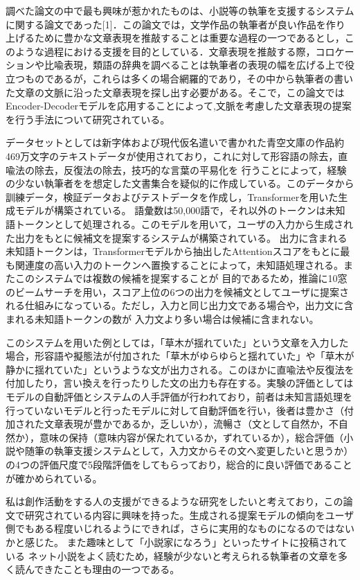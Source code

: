 \documentclass[twocolumn]{jsarticle}     %
\begin{document}
調べた論文の中で最も興味が惹かれたものは、小説等の執筆を支援するシステムに関する論文であった[1]．この論文では，文学作品の執筆者が良い作品を作り上げるために豊かな文章表現を推敲することは重要な過程の一つであるとし，このような過程における支援を目的としている．文章表現を推敲する際，コロケーションや比喩表現，類語の辞典を調べることは執筆者の表現の幅を広げる上で役立つものであるが，これらは多くの場合網羅的であり，その中から執筆者の書いた文章の文脈に沿った文章表現を探し出す必要がある。そこで，この論文では
Encoder-Decoderモデルを応用することによって,文脈を考慮した文章表現の提案を行う手法について研究されている。

データセットとしては新字体および現代仮名遣いで書かれた青空文庫の作品約469万文字のテキストデータが使用されており，これに対して形容語の除去，直喩法の除去，反復法の除去，技巧的な言葉の平易化を
行うことによって，経験の少ない執筆者をを想定した文書集合を疑似的に作成している。このデータから訓練データ，検証データおよびテストデータを作成し，Transformerを用いた生成モデルが構築されている。
語彙数は50,000語で，それ以外のトークンは未知語トークンとして処理される。このモデルを用いて，ユーザの入力から生成された出力をもとに候補文を提案するシステムが構築されている。
出力に含まれる未知語トークンは，Transformerモデルから抽出したAttentionスコアをもとに最も関連度の高い入力のトークンへ置換することによって，未知語処理される。またこのシステムでは複数の候補を提案することが
目的であるため，推論に10窓のビームサーチを用い，スコア上位の6つの出力を候補文としてユーザに提案される仕組みになっている。ただし，入力と同じ出力文である場合や，出力文に含まれる未知語トークンの数が
入力文より多い場合は候補に含まれない。

このシステムを用いた例としては，「草木が揺れていた」という文章を入力した場合，形容語や擬態法が付加された「草木がゆらゆらと揺れていた」や「草木が静かに揺れていた」というような文が出力される。このほかに直喩法や反復法を付加したり，言い換えを行ったりした文の出力も存在する。実験の評価としてはモデルの自動評価とシステムの人手評価が行われており，前者は未知言語処理を行っていないモデルと行ったモデルに対して自動評価を行い，後者は豊かさ（付加された文章表現が豊かであるか，乏しいか），流暢さ（文として自然か，不自然か），意味の保持（意味内容が保たれているか，ずれているか），総合評価（小説や随筆の執筆支援システムとして，入力文からその文へ変更したいと思うか）の4つの評価尺度で5段階評価をしてもらっており，総合的に良い評価であることが確かめられている。

私は創作活動をする人の支援ができるような研究をしたいと考えており，この論文で研究されている内容に興味を持った。生成される提案モデルの傾向をユーザ側でもある程度いじれるようにできれば，さらに実用的なものになるのではないかと感じた。
また趣味として「小説家になろう」といったサイトに投稿されている
ネット小説をよく読むため，経験が少ないと考えられる執筆者の文章を多く読んできたことも理由の一つである。


\nocite{*}

\end{document}
